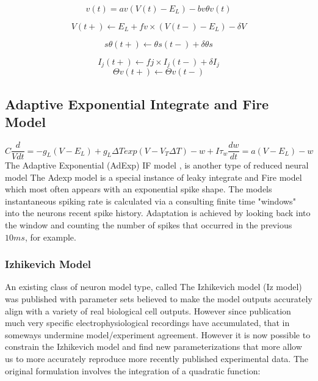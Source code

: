 \begin{equation}
 v(t) = av(V (t) - E_{L}) - bv\theta v(t) 
\end{equation}

\begin{equation}
V (t+) \leftarrow E_{L} + fv \times (V (t-) - E_{L}) - \delta V 
\end{equation}

\begin{equation}
s \theta (t+) \leftarrow \theta s(t-) + \delta \theta s 
\end{equation}

\begin{equation}
I_{j} (t+) \leftarrow fj \times I_{j} (t-) + \delta I_{j}
\end{equation}
\begin{equation}
\Theta v (t+) \leftarrow \Theta v(t-) 
\end{equation}

\subsection{Adaptive Exponential Integrate and Fire Model}
\begin{displaymath}
 C\frac{d}{Vdt}=-g_{L}(V-E_{L})+
g_{L} \Delta Texp(V-V_{T} \Delta T)-w+I 
\tau_{w}\frac{dw}{dt} = a(V-E_{L})-w 
\end{displaymath}
The Adaptive Exponential (AdExp) IF model \cite{brette2005adaptive}, is another type of reduced neural model
The Adexp model is a special instance of leaky integrate and Fire model which most often appears with an exponential spike shape.
The models instantaneous spiking rate is calculated via a consulting finite time "windows" into the neurons recent spike history.
Adaptation is achieved by looking back into the window and counting the number of spikes that occurred in the previous $10ms$, for example. 
\subsubsection{Izhikevich Model}
An existing class of neuron model type, called The Izhikevich model \cite{izhikevich2003simple} (Iz model) was published with parameter sets believed to make the model outputs accurately align with a variety of real biological cell outputs. However since publication much very specific electrophysiological recordings have accumulated, that in someways undermine model/experiment agreement. However it is now possible to constrain the Izhikevich model and find new parameterizations that more allow us to more accurately reproduce more recently published experimental data.
The original formulation involves the integration of a quadratic function:

